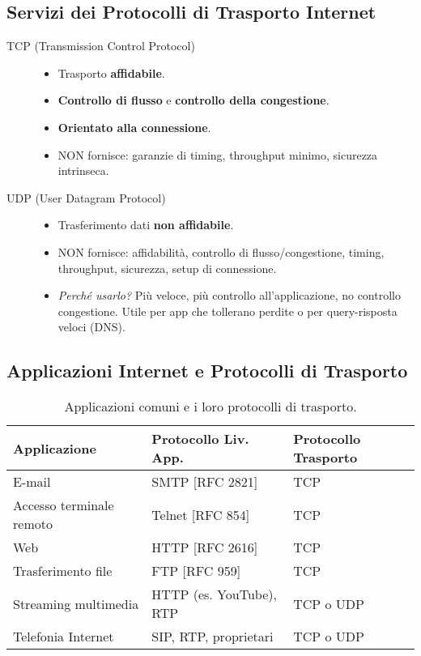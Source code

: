 \subsection{Servizi dei Protocolli di Trasporto Internet}
\begin{description}
    \item[TCP (Transmission Control Protocol)]
    \begin{itemize}
        \item Trasporto \textbf{affidabile}.
        \item \textbf{Controllo di flusso} e \textbf{controllo della congestione}.
        \item \textbf{Orientato alla connessione}.
        \item NON fornisce: garanzie di timing, throughput minimo, sicurezza intrinseca.
    \end{itemize}
    \item[UDP (User Datagram Protocol)]
    \begin{itemize}
        \item Trasferimento dati \textbf{non affidabile}.
        \item NON fornisce: affidabilità, controllo di flusso/congestione, timing, throughput, sicurezza, setup di connessione.
        \item \textit{Perché usarlo?} Più veloce, più controllo all'applicazione, no controllo congestione. Utile per app che tollerano perdite o per query-risposta veloci (DNS).
    \end{itemize}
\end{description}

\subsection{Applicazioni Internet e Protocolli di Trasporto}
\begin{table}[H]
\centering
\begin{tabular}{|l|l|l|}
\hline
\textbf{Applicazione}     & \textbf{Protocollo Liv. App.} & \textbf{Protocollo Trasporto} \\ \hline
E-mail                 & SMTP [RFC 2821]           & TCP                           \\
Accesso terminale remoto & Telnet [RFC 854]          & TCP                           \\
Web                    & HTTP [RFC 2616]           & TCP                           \\
Trasferimento file     & FTP [RFC 959]             & TCP                           \\
Streaming multimedia   & HTTP (es. YouTube), RTP   & TCP o UDP                     \\
Telefonia Internet     & SIP, RTP, proprietari     & TCP o UDP                     \\ \hline
\end{tabular}
\caption{Applicazioni comuni e i loro protocolli di trasporto.}
\end{table}

